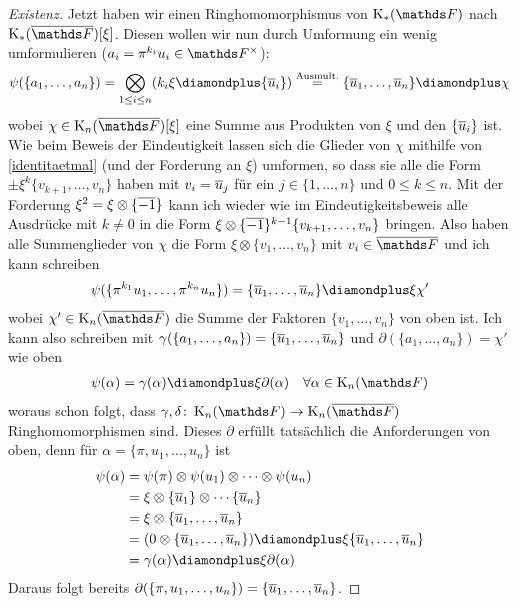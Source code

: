 \documentclass[ngerman,fontsize=11pt, paper=a4, parskip=half, titlepage=true, toc=bib]{scrartcl}
\begin{document}
\begin{proof}[Existenz]
  Jetzt haben wir einen Ringhomomorphismus von $\KF$ nach $\KbF[\xi]$.
  Diesen wollen wir nun durch Umformung ein wenig umformulieren
  ($a_i=\pi^{k_i}u_i\in\Fx$):
  \begin{gather*}
    \psi(\{a_1,\dotsc,a_n\})
    =\bigotimes_{1\leq i\leq n}(k_i\xi\p\{\ov u_i\})
    \overset{\text{Ausmult.}}{=}
    \{\ov u_1,\dotsc,\ov u_n\}\p \chi
  \end{gather*}
  wobei $\chi\in\KnbF[\xi]$ eine Summe aus Produkten von $\xi$ und den
  $\{\overline u_i\}$ ist.
  Wie beim  Beweis der Eindeutigkeit lassen sich die Glieder 
  von $\chi$ mithilfe von \ref{identitaetmal}
  (und der Forderung an $\xi$) umformen, so dass sie alle die Form
  $\pm\xi^k\{v_{k+1},\dotsc,v_n\}$ haben mit $v_i=\overline u_j$ für ein 
  $j\in\{1,\dotsc,n\}$ und $0\leq k\leq n$.
  Mit der Forderung $\xi^2=\xi\otimes\{\overline {-1}\}$ kann ich wieder 
  wie im Eindeutigkeitsbeweis
  alle Ausdrücke mit $k\neq 0$ in die Form
  $\xi\otimes\{\overline{-1}\}^{k-1}\{v_{k+1},\dotsc,v_n\}$ bringen.
  Also haben alle Summenglieder von $\chi$ die Form
  $\xi\otimes\{v_1,\dotsc, v_n\}$ mit $v_i\in\bF$ und ich kann
  schreiben
  \begin{gather*}
    \psi(\{\pi^{k_1}u_1,\dotsc,\pi^{k_n}u_n\}) 
    = \{\ov u_1,\dotsc,\ov u_n\}\p \xi\chi'
  \end{gather*}
  wobei $\chi'\in\KnbF$ die Summe der Faktoren $\{v_1,\dotsc,v_n\}$
  von oben ist.
  Ich kann also schreiben mit $\gamma(\{a_1,\dotsc,a_n\})=\{\overline
  u_1,\dotsc,\overline u_n\}$
  und $\partial(\{a_1,\dotsc,a_n\})=\chi'$ wie oben
  \begin{gather*}
    \psi(\alpha) = \gamma(\alpha)\p \xi\partial(\alpha)
    \quad \forall\alpha\in\KnF
  \end{gather*}
  woraus schon folgt, dass $\gamma,\delta\colon\KnF\to\KnbF$ 
  Ringhomomorphismen sind.
  Dieses $\partial$ erfüllt tatsächlich die Anforderungen von oben,
  denn für $\alpha=\{\pi,u_1,\dotsc, u_n\}$ ist
  \begin{align*}
    \psi(\alpha)
    &=\psi(\pi)\otimes\psi(u_1)\otimes\dotsb\otimes\psi(u_n)\\
    &=\xi\otimes\{\ov u_1\}\otimes\dotsb\{\ov u_n\}\\
    &=\xi\otimes\{\ov u_1,\dotsc,\ov u_n\}\\
    &=(0\otimes\{\ov u_1,\dotsc,\ov u_n\})
      \p\xi\{\ov u_1,\dotsc,\ov u_n\}\\
    &=\gamma(\alpha) \p \xi\partial(\alpha)
  \end{align*}
  Daraus folgt bereits
  $\partial(\{\pi,u_1,\dotsc,u_n\})=\{\overline u_1,\dotsc,\overline u_n\}$.  
\end{proof}
\end{document}
